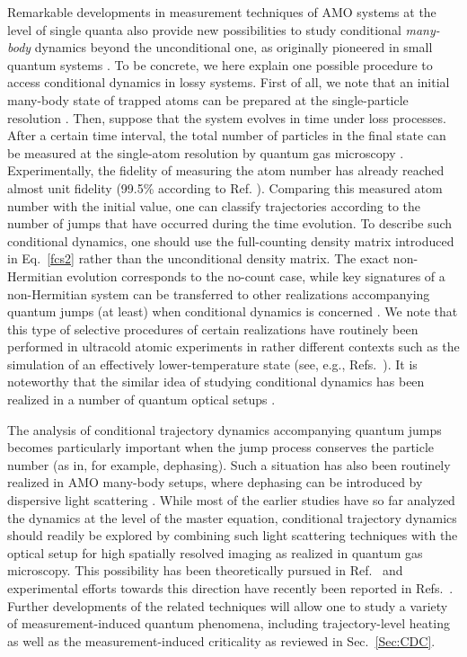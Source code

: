 \documentclass{tADP2e}
\theoremstyle{plain}
\theoremstyle{plain}
\theoremstyle{definition}
\begin{document}
 Remarkable developments in measurement techniques of AMO systems at the level of single quanta also provide new possibilities to study conditional {\it many-body} dynamics beyond the unconditional one, as originally pioneered in small quantum systems \cite{HS132}. To be concrete, we here explain one possible procedure to access conditional dynamics in lossy systems.
 First of all, we note that an initial many-body state of trapped atoms can be prepared at the single-particle resolution  \cite{IR15}. Then, suppose that the system  evolves in time under loss processes. After a certain time interval, the total number of particles in the final state can be measured at the single-atom resolution by quantum gas microscopy  \cite{PPM152}. Experimentally, the fidelity of measuring the atom number has already reached almost unit fidelity (99.5\% according to Ref.  \cite{SJF10}). Comparing this measured atom number with  the initial value, one can classify trajectories according to the number of jumps that have occurred during the time evolution. To describe such conditional dynamics, one should use the full-counting density matrix introduced in Eq.~\eqref{fcs2} rather than the unconditional density matrix. The exact non-Hermitian evolution corresponds to the no-count case, while key signatures of a non-Hermitian system can be transferred to other realizations accompanying quantum jumps (at least) when conditional dynamics is concerned  \cite{YA18}. 
 We note that this type of selective procedures of certain realizations have routinely  been performed in ultracold atomic experiments in rather different contexts such as 
the simulation of an effectively lower-temperature state (see, e.g., Refs.~\cite{EM11,FT15,IR15,PM16f}). It is noteworthy that the similar idea of studying conditional dynamics has been realized in a number of quantum optical setups \cite{TJS16,LX17,NaM19,Quiroz-Juarez:19,CW20,SCW20}.

The analysis of conditional trajectory dynamics accompanying quantum jumps  becomes particularly important when the jump process conserves the particle number (as in, for example, dephasing). Such a situation has also been routinely realized in AMO many-body setups, where dephasing can be introduced by dispersive light scattering \cite{PYS14,RB16,LHP17}. While most of the earlier studies have so far analyzed the dynamics at the level of the master equation,  conditional trajectory dynamics should readily be explored by combining such light scattering techniques with the optical setup for high spatially resolved imaging as realized in quantum gas microscopy. This possibility has been theoretically pursued in Ref.~\cite{YA15} and experimental efforts towards this direction have recently been reported in Refs.~\cite{PYS15,AA16,SS192,MM19}. Further developments of the related techniques will allow one to study a variety of measurement-induced quantum phenomena, including trajectory-level heating as well as the measurement-induced criticality as reviewed in Sec.~\ref{Sec:CDC}.
\end{document}

